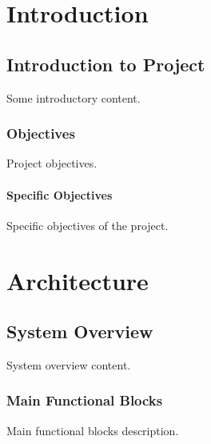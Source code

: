 \documentclass[a4paper,12pt]{book}
\begin{document}
\tableofcontents

\chapter{Introduction}

\section{Introduction to Project}

Some introductory content.

\subsection{Objectives}

Project objectives.

\subsubsection{Specific Objectives}

Specific objectives of the project.

\chapter{Architecture}

\section{System Overview}

System overview content.

\subsection{Main Functional Blocks}

Main functional blocks description.
\end{document}
